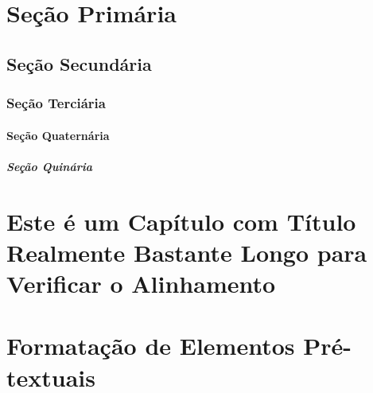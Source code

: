 \documentclass[times,english,brazil,oneside]{ifes7}
\begin{document}
\blindenumerate[5]

\blindtext



\chapter{Seção Primária}
\label{cha:secao-primaria}

\blindtext[1]

\section{Seção Secundária}
\label{sec:secao-secundaria}

\blindtext[1]

\subsection{Seção Terciária}
\label{sec:secao-terciaria}

\blindtext[1]

\subsubsection{Seção Quaternária}
\label{sec:secao-quaternaria}

\blindtext[1]

\paragraph{Seção Quinária}
\label{sec:secao-quinaria}

\blindtext[1]


\chapter{Este é um Capítulo com Título Realmente Bastante
  Longo para Verificar o Alinhamento}


\blindtext



\chapter{Formatação de Elementos Pré-textuais}
\label{cha:format-pre-text}
\end{document}
